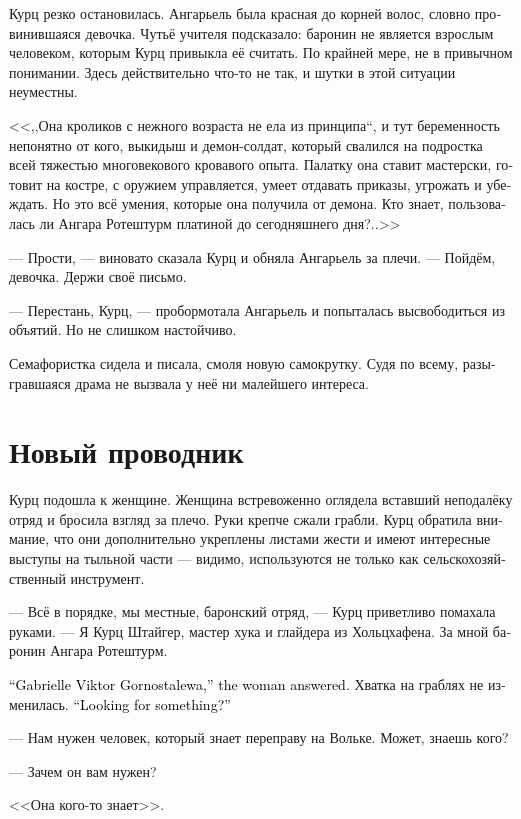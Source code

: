 \documentclass[a4paper,12pt,fleqn]{book}\usepackage{cooltooltips}\usepackage{polyglossia}\setdefaultlanguage[babelshorthands=true]{russian}\setotherlanguage{english}\defaultfontfeatures{Ligatures=TeX,Mapping=tex-text} \usepackage{xcolor}\definecolor{lightgray}{HTML}{bbbbbb}\color{lightgray}\newcommand{\ml}[3]{\textenglish{\textcolor{black}{#3}}}
\begin{document}
Курц резко остановилась.
Ангарьель была красная до корней волос, словно провинившаяся девочка.
Чутьё учителя подсказало: баронин не является взрослым человеком, которым Курц привыкла её считать.
По крайней мере, не в привычном понимании.
Здесь действительно что-то не так, и шутки в этой ситуации неуместны.

<<,,Она кроликов с нежного возраста не ела из принципа``, и тут беременность непонятно от кого, выкидыш и демон-солдат, который свалился на подростка всей тяжестью многовекового кровавого опыта.
Палатку она ставит мастерски, готовит на костре, с оружием управляется, умеет отдавать приказы, угрожать и убеждать.
Но это всё умения, которые она получила от демона.
Кто знает, пользовалась ли Ангара Ротештурм платиной до сегодняшнего дня?..>>

--- Прости, --- виновато сказала Курц и обняла Ангарьель за плечи.
--- Пойдём, девочка.
Держи своё письмо.

--- Перестань, Курц, --- пробормотала Ангарьель и попыталась высвободиться из объятий.
Но не слишком настойчиво.

Семафористка сидела и писала, смоля новую самокрутку.
Судя по всему, разыгравшаяся драма не вызвала у неё ни малейшего интереса.

\section{Новый проводник}

Курц подошла к женщине.
Женщина встревоженно оглядела вставший неподалёку отряд и бросила взгляд за плечо.
Руки крепче сжали грабли.
Курц обратила внимание, что они дополнительно укреплены листами жести и имеют интересные выступы на тыльной части --- видимо, используются не только как сельскохозяйственный инструмент.

--- Всё в порядке, мы местные, баронский отряд, --- Курц приветливо помахала руками.
--- Я Курц Штайгер, мастер хука и глайдера из Хольцхафена.
За мной баронин Ангара Ротештурм.

\ml{$0$}
{--- Габриэль Виктор Горносталева, --- представилась женщина.}
{``Gabrielle Viktor Gornostalewa,'' the woman answered.}
Хватка на граблях не изменилась.
\ml{$0$}
{--- Вы что-то ищете?}
{``Looking for something?''}

--- Нам нужен человек, который знает переправу на Вольке.
Может, знаешь кого?

--- Зачем он вам нужен?

<<Она кого-то знает>>.
\end{document}
